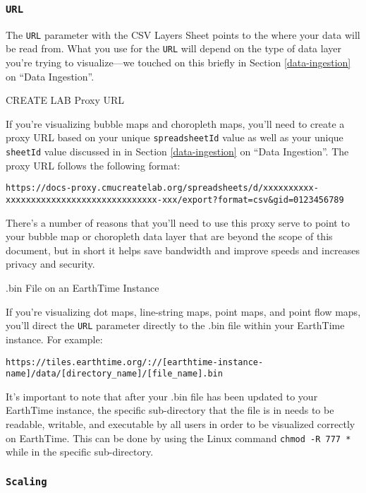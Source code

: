 \documentclass[
  12pt,
]{krantz}
\begin{document}
\hypertarget{url}{%
\subsubsection*{\texorpdfstring{\texttt{URL}}{URL}}\label{url}}


The \texttt{URL} parameter with the CSV Layers Sheet points to the where your data will be read from. What you use for the \texttt{URL} will depend on the type of data layer you're trying to visualize---we touched on this briefly in Section \ref{data-ingestion} on ``Data Ingestion''.

CREATE LAB Proxy URL

If you're visualizing bubble maps and choropleth maps, you'll need to create a proxy URL based on your unique \texttt{spreadsheetId} value as well as your unique \texttt{sheetId} value discussed in in Section \ref{data-ingestion} on ``Data Ingestion''. The proxy URL follows the following format:

\texttt{https://docs-proxy.cmucreatelab.org/spreadsheets/d/xxxxxxxxxx-xxxxxxxxxxxxxxxxxxxxxxxxxxxxxx-xxx/export?format=csv\&gid=0123456789}

There's a number of reasons that you'll need to use this proxy serve to point to your bubble map or choropleth data layer that are beyond the scope of this document, but in short it helps save bandwidth and improve speeds and increases privacy and security.

.bin File on an EarthTime Instance

If you're visualizing dot maps, line-string maps, point maps, and point flow maps, you'll direct the \texttt{URL} parameter directly to the .bin file within your EarthTime instance. For example:

\texttt{https://tiles.earthtime.org/://{[}earthtime-instance-name{]}/data/{[}directory\_name{]}/{[}file\_name{]}.bin}

It's important to note that after your .bin file has been updated to your EarthTime instance, the specific sub-directory that the file is in needs to be readable, writable, and executable by all users in order to be visualized correctly on EarthTime. This can be done by using the Linux command \texttt{chmod\ -R\ 777\ *} while in the specific sub-directory.

\hypertarget{scaling}{%
\subsubsection*{\texorpdfstring{\texttt{Scaling}}{Scaling}}\label{scaling}}
\end{document}
